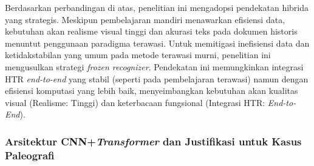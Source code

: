 Berdasarkan perbandingan di atas, penelitian ini mengadopsi pendekatan hibrida yang strategis. Meskipun pembelajaran mandiri menawarkan efisiensi data, kebutuhan akan realisme visual tinggi dan akurasi teks pada dokumen historis menuntut penggunaan paradigma terawasi. Untuk memitigasi inefisiensi data dan ketidakstabilan yang umum pada metode terawasi murni, penelitian ini mengusulkan strategi \textit{frozen recognizer}. Pendekatan ini memungkinkan integrasi HTR \textit{end-to-end} yang stabil (seperti pada pembelajaran terawasi) namun dengan efisiensi komputasi yang lebih baik, menyeimbangkan kebutuhan akan kualitas visual (Realisme: Tinggi) dan keterbacaan fungsional (Integrasi HTR: \textit{End-to-End}).

\subsubsection{Arsitektur CNN+\textit{Transformer} dan Justifikasi untuk Kasus Paleografi}
\label{subsubsec:arsitektur-cnn-transformer-paleografi}

